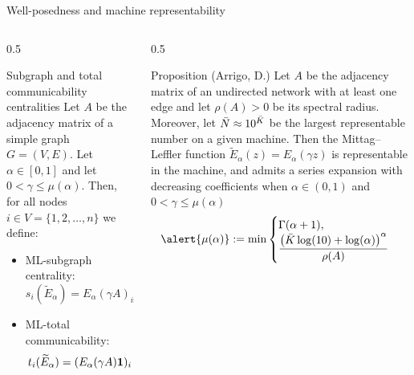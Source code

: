\documentclass[aspectratio=169,xcolor=dvipsnames]{beamer}
\newcommand{\bone}{{\bf 1}}
\begin{document}
\begin{frame}{Well-posedness and machine representability}
\begin{columns}
	\begin{column}{0.5\columnwidth}
		\begin{block}{Subgraph and total communicability centralities}
				Let $A$ be the adjacency matrix of a simple graph $G = (V, E)$. Let $\alpha\in[0,1]$ and \alert{let $0<\gamma \leq \mu(\alpha)$}. 
				Then, for all nodes $i\in V = \{1,2,\ldots,n\}$ we define: 
				\begin{itemize}
					\item ML-subgraph centrality:\vspace*{-3pt} 
					\[s_i(\widetilde{E}_\alpha) = E_\alpha(\gamma A)_{ii}\]
					\item ML-total communicability:\vspace*{-3pt} 
					\[t_i(\widetilde{E}_\alpha) = (E_\alpha(\gamma A)\bone)_{i}\]
				\end{itemize}
		\end{block}
	\end{column}
	\begin{column}{0.5\columnwidth}
	\begin{block}{\small Proposition (Arrigo, D.)}
	\small
	Let $A$ be the adjacency matrix of an undirected network with at least one edge and let $\rho(A)>0$ be its spectral radius. Moreover, let $\Bar{N}\approx 10^{\Bar{K}}$ be the largest representable number on a given machine. Then the  Mittag--Leffler function $\widetilde{E}_\alpha(z) = E_{\alpha}(\gamma z)$ is representable in the machine, and admits a series expansion with decreasing coefficients when $\alpha \in (0,1)$ and $0< \gamma \leq  \mu(\alpha)$
	\begin{equation*}
	\alert{\mu(\alpha)}:=\min\begin{cases} \Gamma(\alpha+1),\\\displaystyle \frac{\left( \bar{K}\log(10) + \log(\alpha)\right)^\alpha}{\rho(A)}\end{cases}
	\end{equation*}
	\end{block}
	\end{column}
\end{columns}
\end{frame}
\end{document}
